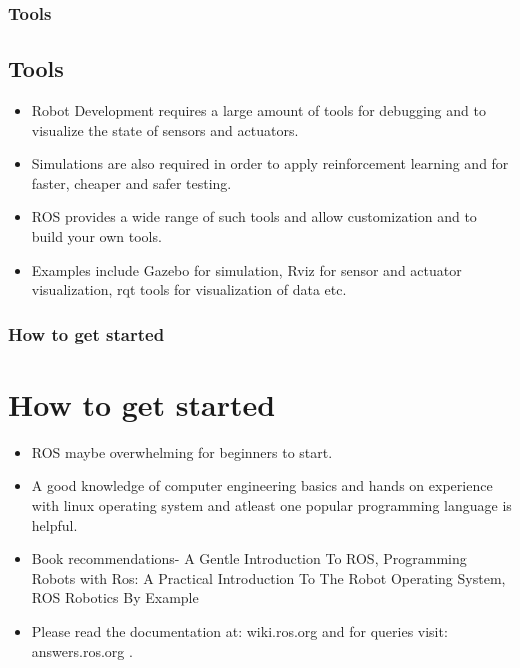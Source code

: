 \documentclass{beamer}
\begin{document}
	\begin{frame}
	    \frametitle{Tools}
	    \subsection{Tools}
	    \begin{itemize}
	        \item Robot Development requires a large amount of tools for debugging and to visualize the state of sensors and actuators.\medskip
	        \item Simulations are also required in order to apply reinforcement learning and for faster, cheaper and safer testing.\medskip 
	        \item ROS provides a wide range of such tools and allow customization and to build your own tools.\medskip 
	        \item Examples include Gazebo for simulation, Rviz for sensor and actuator visualization, rqt tools for visualization of data etc.

	    \end{itemize}
	\end{frame}




	\begin{frame}
	    \frametitle{How to get started}
	    \section{How to get started}
	    \begin{itemize}
	        \item ROS maybe overwhelming for beginners to start.\medskip
	        \item A good knowledge of computer engineering basics and hands on experience with linux operating system and atleast one popular programming language is helpful.\medskip 
	        \item Book recommendations- A Gentle Introduction To ROS\cite{o2014gentle}, Programming Robots with Ros: A Practical Introduction To The Robot Operating System\cite{quigley2015programming}, ROS Robotics By Example\cite{fairchild2016ros}\medskip
	        \item Please read the documentation at: wiki.ros.org and for queries visit: answers.ros.org .

	    \end{itemize}
	\end{frame}
\end{document}
